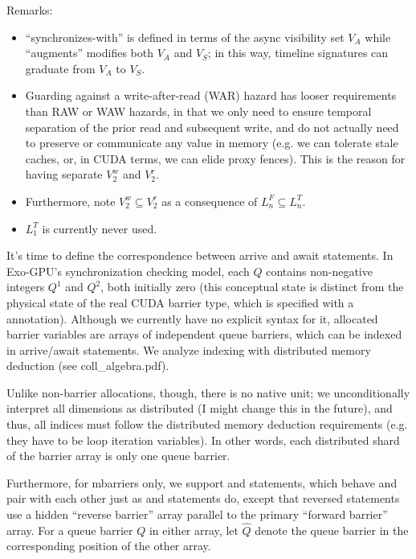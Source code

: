 \filbreak
Remarks:
\begin{itemize}
  \item ``synchronizes-with'' is defined in terms of the async visibility set $V_A$ while ``augments'' modifies both $V_A$ and $V_S$; in this way, timeline signatures can graduate from $V_A$ to $V_S$.
  \filbreak
  \item Guarding against a write-after-read (WAR) hazard has looser requirements than RAW or WAW hazards, in that we only need to ensure temporal separation of the prior read and subsequent write, and do not actually need to preserve or communicate any value in memory (e.g. we can tolerate stale caches, or, in CUDA terms, we can elide proxy fences).
  This is the reason for having separate $V_2^w$ and $V_2^r$.
  \filbreak
  \item Furthermore, note $V_2^w \subseteq V_2^r$ as a consequence of $L_n^F \subseteq L_n^T$.
  \filbreak
  \item $L_1^T$ is currently never used.
\end{itemize}

\newpage
{}
\label{ch:ArriveAwaitPairing}

It's time to define the correspondence between arrive and await statements.
In Exo-GPU's synchronization checking model, each  $Q$ contains non-negative integers  $Q^1$ and  $Q^2$, both initially zero (this conceptual state is distinct from the physical state of the real CUDA barrier type, which is specified with a  annotation).
Although we currently have no explicit syntax for it, allocated barrier variables are arrays of independent queue barriers, which can be indexed in arrive/await statements.
We analyze indexing with distributed memory deduction (see coll\_algebra.pdf).



\filbreak
Unlike non-barrier allocations, though, there is no native unit; we unconditionally interpret all dimensions as distributed (I might change this in the future), and thus, all indices must follow the distributed memory deduction requirements (e.g. they have to be  loop iteration variables).
In other words, each distributed shard of the barrier array is only one queue barrier.

\filbreak
Furthermore, for mbarriers only, we support  and  statements, which behave and pair with each other just as  and  statements do, except that reversed statements use a hidden ``reverse barrier'' array parallel to the primary ``forward barrier'' array.
For a queue barrier $Q$ in either array, let $\widehat{Q}$ denote the queue barrier in the corresponding position of the other array.

